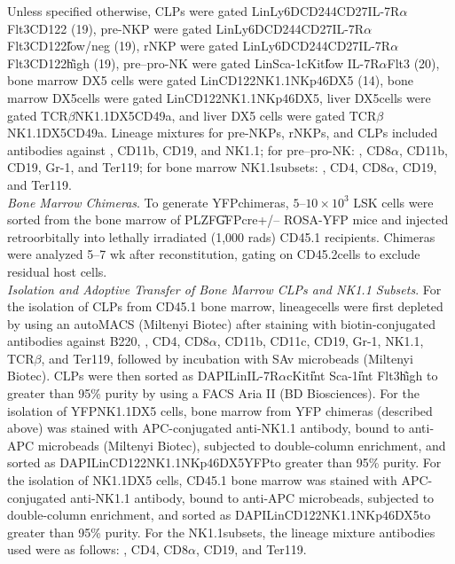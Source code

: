 Unless specified otherwise, CLPs were gated Lin\UM Ly6D\UM CD244\UP CD27\UP IL-7R$\alpha$\UP Flt3\UP CD122\UM{} (19), pre-NKP were gated Lin\UM Ly6D\UM CD244\UP CD27\UP IL-7R$\alpha$\UP Flt3\UM CD122\U{low/neg} (19), rNKP were gated Lin\UM Ly6D\UM CD244\UP CD27\UP IL-7R$\alpha$\UP Flt3\UM CD122\U{high} (19), pre–pro-NK were gated Lin\UM Sca-1\UP cKit\U{low} IL-7R$\alpha$\UP Flt3\UM{} (20), bone marrow DX5\UM{} cells were gated Lin\UM CD122\UP NK1.1\UP NKp46\UP DX5\UM{} (14), bone marrow DX5\UP cells were gated Lin\UM CD122\UP NK1.1\UP NKp46\UP DX5\UP, liver DX5\UP cells were gated \CDte\UM TCR$\beta$\UM NK1.1\UP DX5\UP CD49a\UM, and liver DX5\UM{} cells were gated \CDte\UM TCR$\beta$\UM NK1.1\UP DX5\UM CD49a\UP. Lineage mixtures for pre-NKPs, rNKPs, and CLPs included antibodies against \CDte, CD11b, CD19, and NK1.1; for pre–pro-NK: \CDte, CD8$\alpha$, CD11b, CD19, Gr-1, and Ter119; for bone marrow NK1.1\UP subsets: \CDte, CD4, CD8$\alpha$, CD19, and Ter119.
\\
\textit{Bone Marrow Chimeras}. To generate YFP\UM chimeras, $5–10 \times 10^3$ LSK cells were sorted from the bone marrow of PLZF\U{GFPcre+/--} ROSA-YFP mice and injected retroorbitally into lethally irradiated (1,000 rads) CD45.1 recipients. Chimeras were analyzed 5–7 wk after reconstitution, gating on CD45.2\UP cells to exclude residual host cells.
\\
\textit{Isolation and Adoptive Transfer of Bone Marrow CLPs and NK1.1\UP{} Subsets}. For the isolation of CLPs from CD45.1 bone marrow, lineage\UP cells were first depleted by using an autoMACS (Miltenyi Biotec) after staining with biotin-conjugated antibodies against B220, \CDte, CD4, CD8$\alpha$, CD11b, CD11c, CD19, Gr-1, NK1.1, TCR$\beta$, and Ter119, followed by incubation with SAv microbeads (Miltenyi Biotec). CLPs were then sorted as DAPI\UM Lin\UM IL-7R$\alpha$\UP cKit\U{int} Sca-1\U{int} Flt3\U{high} to greater than 95\% purity by using a FACS Aria II (BD Biosciences). For the isolation of YFP\UP NK1.1\UP DX5\UM{} cells, bone marrow from YFP\UM{} chimeras (described above) was stained with APC-conjugated anti-NK1.1 antibody, bound to anti-APC microbeads (Miltenyi Biotec), subjected to double-column enrichment, and sorted as DAPI\UM Lin\UM CD122\UP NK1.1\UP NKp46\UP DX5\UM YFP\UP to greater than 95\% purity. For the isolation of NK1.1\UP DX5\UM{} cells, CD45.1 bone marrow was stained with APC-conjugated anti-NK1.1 antibody, bound to anti-APC microbeads, subjected to double-column enrichment, and sorted as DAPI\UM Lin\UM CD122\UP NK1.1\UP NKp46\UP DX5\UM to greater than 95\% purity. For the NK1.1\UP subsets, the lineage mixture antibodies used were as follows: \CDte, CD4, CD8$\alpha$, CD19, and Ter119.
